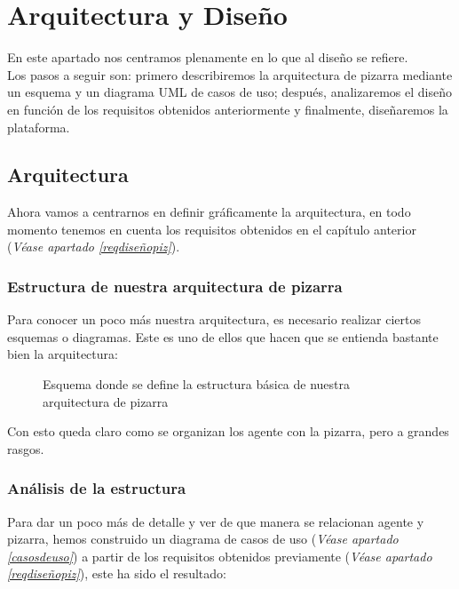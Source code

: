 \chapter{Arquitectura y Diseño}

\lettrine[lines=1,slope=4pt,findent=0pt]{E}{}n este apartado nos centramos plenamente en lo que al diseño se refiere.\\

Los pasos a seguir son: primero describiremos la arquitectura de pizarra mediante un esquema y un diagrama UML de casos de uso; después, analizaremos el diseño en función de los requisitos obtenidos anteriormente y finalmente, diseñaremos la plataforma.

\section{Arquitectura}
Ahora vamos a centrarnos en definir gráficamente la arquitectura, en todo momento tenemos en cuenta los requisitos obtenidos en el capítulo anterior (\textit{Véase apartado \ref{reqdiseñopiz}}).

\subsection[Estructura de la arquitectura]{Estructura de nuestra arquitectura de pizarra}
Para conocer un poco más nuestra arquitectura, es necesario realizar ciertos esquemas o diagramas. Este es uno de ellos que hacen que se entienda bastante bien la arquitectura:

\begin{figure}[H]
\begin{center}
\end{center}
\caption[Estructura de la arquitectura]{Esquema donde se define la estructura básica de nuestra arquitectura de pizarra}
\end{figure}

Con esto queda claro como se organizan los agente con la pizarra, pero a grandes rasgos.

\subsection{Análisis de la estructura}
Para dar un poco más de detalle y ver de que manera se relacionan agente y pizarra, hemos construido un diagrama de casos de uso (\textit{Véase apartado \ref{casosdeuso}}) a partir de los requisitos obtenidos previamente (\textit{Véase apartado \ref{reqdiseñopiz}}), este ha sido el resultado:

